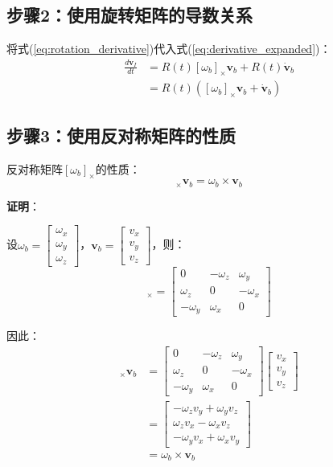 \documentclass[12pt,a4paper]{article}
\begin{document}
\subsection{步骤2：使用旋转矩阵的导数关系}

将式(\ref{eq:rotation_derivative})代入式(\ref{eq:derivative_expanded})：
\begin{align}
\frac{d\bm{v}_I}{dt} &= R(t) [\omega_b]_{\times} \bm{v}_b + R(t) \dot{\bm{v}}_b \\
&= R(t) ([\omega_b]_{\times} \bm{v}_b + \dot{\bm{v}}_b)
\label{eq:intermediate}
\end{align}

\subsection{步骤3：使用反对称矩阵的性质}

反对称矩阵$[\omega_b]_{\times}$的性质：
\begin{equation}
[\omega_b]_{\times} \bm{v}_b = \omega_b \times \bm{v}_b
\label{eq:skew_property}
\end{equation}

\textbf{证明}：

设$\omega_b = \begin{bmatrix} \omega_x \\ \omega_y \\ \omega_z \end{bmatrix}$，$\bm{v}_b = \begin{bmatrix} v_x \\ v_y \\ v_z \end{bmatrix}$，则：
\begin{equation}
[\omega_b]_{\times} = \begin{bmatrix}
0 & -\omega_z & \omega_y \\
\omega_z & 0 & -\omega_x \\
-\omega_y & \omega_x & 0
\end{bmatrix}
\end{equation}

因此：
\begin{align}
[\omega_b]_{\times} \bm{v}_b &= \begin{bmatrix}
0 & -\omega_z & \omega_y \\
\omega_z & 0 & -\omega_x \\
-\omega_y & \omega_x & 0
\end{bmatrix} \begin{bmatrix}
v_x \\ v_y \\ v_z
\end{bmatrix} \\
&= \begin{bmatrix}
-\omega_z v_y + \omega_y v_z \\
\omega_z v_x - \omega_x v_z \\
-\omega_y v_x + \omega_x v_y
\end{bmatrix} \\
&= \omega_b \times \bm{v}_b
\end{align}
\end{document}
